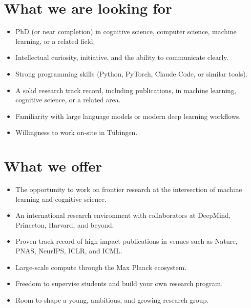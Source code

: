 \section*{What we are looking for}
\begin{itemize}
  \item PhD (or near completion) in cognitive science, computer science, machine learning, or a related field.
  \item Intellectual curiosity, initiative, and the ability to communicate clearly.
  \item Strong programming skills (Python, PyTorch, Claude Code, or similar tools).
  \item A solid research track record, including publications, in machine learning, cognitive science, or a related area.
  \item Familiarity with large language models or modern deep learning workflows.
  \item Willingness to work on-site in Tübingen.
\end{itemize}

\section*{What we offer}
\begin{itemize}
  \item The opportunity to work on frontier research at the intersection of machine learning and cognitive science.
  \item An international research environment with collaborators at DeepMind, Princeton, Harvard, and beyond.
  \item Proven track record of high-impact publications in venues such as Nature, PNAS, NeurIPS, ICLR, and ICML.
  \item Large-scale compute through the Max Planck ecosystem.
  \item Freedom to supervise students and build your own research program.
  \item Room to shape a young, ambitious, and growing research group.
\end{itemize}

